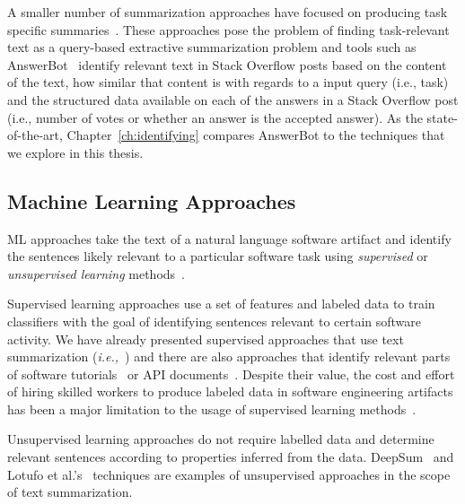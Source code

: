 A smaller number of summarization approaches have focused on
producing task specific summaries~\cite{Xu2017, silva2019}.
These approaches pose the problem of finding task-relevant text 
as a query-based extractive summarization problem and
tools such as AnswerBot~\cite{Xu2017}
identify relevant text in Stack Overflow posts 
based on 
the content of the text, how similar that content is with regards to a input query (i.e., task)
and the structured data available on each of the answers in a Stack Overflow post 
(i.e., number of votes or whether an answer is the accepted answer).
As the state-of-the-art, Chapter~\ref{ch:identifying}
compares AnswerBot to the techniques that we explore in this thesis.



\subsection{Machine Learning Approaches}
\label{cp2:machine-learning}


\acf{ML} approaches take the text of a natural language software artifact and identify 
the sentences likely relevant to a particular software task using \textit{supervised} or 
\textit{unsupervised learning} methods~\cite{zhang2005machine}.



Supervised learning approaches use a set of features and labeled data
 to train classifiers with the goal of identifying sentences relevant to 
 certain software activity.
We have already presented supervised approaches that use text summarization (\textit{i.e.,}~\cite{Rastkar2010})
and there are also approaches that identify relevant 
parts of software tutorials~\cite{Jiang2016b}
or API documents~\cite{fucci2019, Maalej2013}.
Despite their value, 
the cost and effort of hiring skilled workers to produce 
labeled data in software engineering artifacts 
has been a major limitation 
to the usage of supervised learning 
methods~\cite{Arpteg2018}.





Unsupervised learning approaches do not require labelled data and determine 
relevant sentences according to properties inferred from the data. 
DeepSum~\cite{Li2018} and Lotufo et al.'s~\cite{Lotufo2012} techniques are examples of 
unsupervised approaches in the scope of text summarization. 



